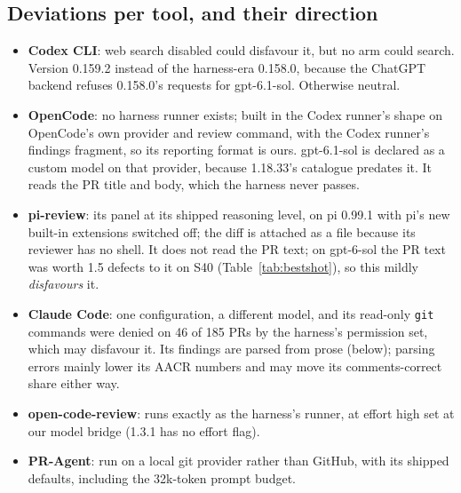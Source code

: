 \documentclass[11pt,a4paper]{article}
\newcommand{\code}[1]{\texttt{#1}}
\begin{document}
\subsection{Deviations per tool, and their direction}
\label{sec:deviations}

\begin{itemize}
  \item \textbf{Codex CLI}: web search disabled could disfavour it, but no
  arm could search. Version 0.159.2 instead of the harness-era 0.158.0,
  because the ChatGPT backend refuses 0.158.0's requests for gpt-6.1-sol.
  Otherwise neutral.
  \item \textbf{OpenCode}: no harness runner exists; built in the Codex
  runner's shape on OpenCode's own provider and review command, with the
  Codex runner's findings fragment, so its reporting format is ours.
  gpt-6.1-sol is declared as a custom model on that provider, because
  1.18.33's catalogue predates it. It reads the PR title and body, which the
  harness never passes.
  \item \textbf{pi-review}: its panel at its shipped reasoning level, on pi
  0.99.1 with pi's new built-in extensions switched off; the diff is attached
  as a file because its reviewer has no shell. It does not read the PR text;
  on gpt-6-sol the PR text was worth 1.5 defects to it on S40
  (Table~\ref{tab:bestshot}), so this mildly \emph{disfavours} it.
  \item \textbf{Claude Code}: one configuration, a different model, and its
  read-only \code{git} commands were denied on 46 of 185 PRs by the
  harness's permission set, which may disfavour it. Its findings are parsed
  from prose (below); parsing errors mainly lower its AACR numbers and may
  move its comments-correct share either way.
  \item \textbf{open-code-review}: runs exactly as the harness's runner, at
  effort high set at our model bridge (1.3.1 has no effort flag).
  \item \textbf{PR-Agent}: run on a local git provider rather than GitHub,
  with its shipped defaults, including the 32k-token prompt budget.
\end{itemize}
\end{document}
